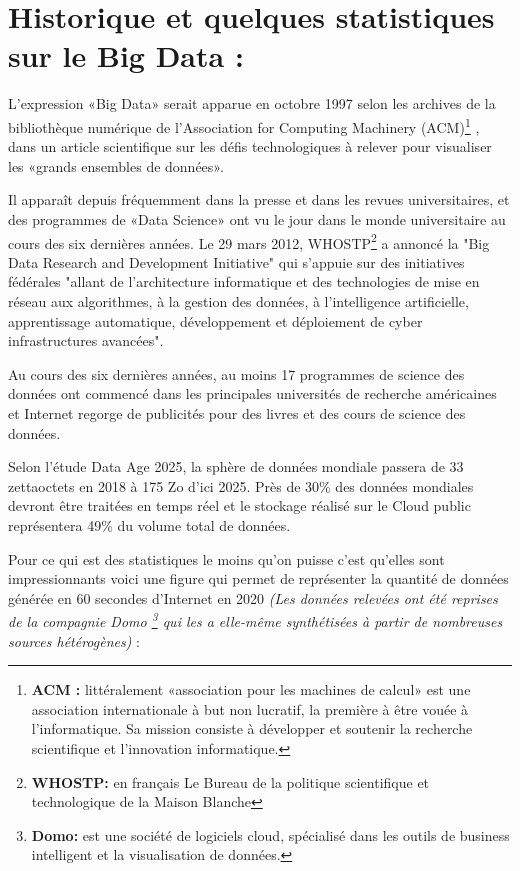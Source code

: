 \section{Historique et quelques statistiques sur le Big Data : }
L'expression «Big Data» serait apparue en octobre 1997 selon les archives de la bibliothèque numérique de l'Association for Computing Machinery (ACM)\footnote{\textbf{ACM :} littéralement «association pour les machines de calcul» est une association internationale à but non lucratif, la première à être vouée à l'informatique. Sa mission consiste à développer et soutenir la recherche scientifique et l'innovation informatique.} 
, dans un article scientifique sur les défis technologiques à relever pour visualiser les «grands ensembles de données».

Il apparaît depuis fréquemment dans la presse et dans les revues universitaires, et des programmes de «Data Science» ont vu le jour dans le monde universitaire au cours des six dernières années. Le 29 mars 2012, WHOSTP\footnote{\textbf{WHOSTP: }en français Le Bureau de la politique scientifique et technologique de la Maison Blanche} a annoncé la "Big Data Research and Development Initiative" qui s'appuie sur des initiatives fédérales "allant de l'architecture informatique et des technologies de mise en réseau aux algorithmes, à la gestion des données, à l'intelligence artificielle, apprentissage automatique, développement et déploiement de cyber infrastructures avancées".

Au cours des six dernières années, au moins 17 programmes de science des données ont commencé dans les principales universités de recherche américaines et Internet regorge de publicités pour des livres et des cours de science des données. 

Selon l'étude Data Age 2025, la sphère de données mondiale passera de 33 zettaoctets en 2018 à 175 Zo d'ici 2025. Près de 30\% des données mondiales devront être traitées en temps réel et le stockage réalisé sur le Cloud public représentera 49\% du volume total de données.

Pour ce qui est des statistiques le moins qu'on puisse c'est qu'elles sont impressionnants voici une figure qui permet de représenter la quantité de données générée en 60 secondes d'Internet en 2020 
\textit{(Les données relevées ont été reprises de la compagnie Domo \footnote{\textbf{Domo: } est une société de logiciels cloud, spécialisé dans les outils de business intelligent et la visualisation de données.} qui les a elle-même synthétisées à partir de nombreuses sources hétérogènes)} :

